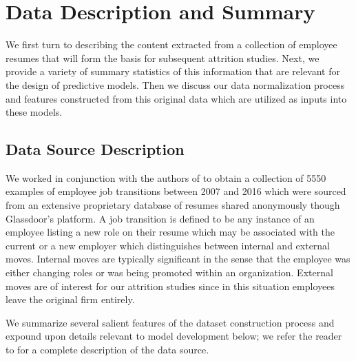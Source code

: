 \documentclass[10pt]{article}
\begin{document}
\section{Data Description and Summary} \label{datsec}

\hspace{\parindent} We first turn to describing the content extracted from a collection of 
employee resumes that will form the basis for subsequent attrition studies. 
Next, we provide a variety of summary statistics of this information that 
are relevant for the design of predictive models.  Then we discuss 
our data normalization process and 
features constructed from this original data which are utilized 
as inputs into these models.

\subsection{Data Source Description}\label{datdes}

\hspace{\parindent} We worked in conjunction with the authors of \cite{Smart2016} to obtain 
a collection of 5550 examples of employee job transitions between 
2007 and 2016 which were sourced from an extensive proprietary database of 
resumes shared anonymously though Glassdoor's platform.  A job transition 
is defined to be any instance of an employee listing a new role on their 
resume which may be associated with the current or a new employer
which distinguishes between internal and external moves.  Internal moves are typically 
significant in the sense that the employee was either changing roles or was
being promoted within an organization. External moves are of interest for our 
attrition studies since in this situation employees leave the original 
firm entirely.

We summarize several salient features of the dataset construction process 
and expound upon details relevant to model development below; we refer the
reader to \cite{Smart2016} for a complete description of the data source. 
\end{document}
